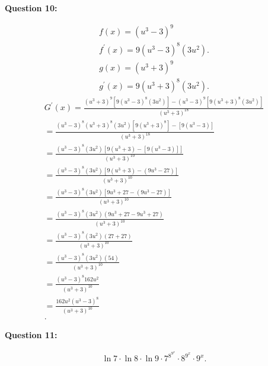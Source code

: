 \documentclass{report}
\begin{document}
    \bigbreak \noindent \bigbreak \noindent 
    \begin{Large}
        \textbf{Question 10:}
    \end{Large}
    \bigbreak \noindent 
    \bigbreak \noindent 
    \begin{align*}
      f(x) = (u^{3}-3)^{9} \\
      f^{\prime}(x) = 9(u^{3}-3)^{8}(3u^{2})
    .\end{align*}
    \begin{align*}
      g(x) = (u^{3}+3)^{9} \\
      g^{\prime}(x) = 9(u^{3}+3)^{8}(3u^{2})
    .\end{align*}
    \begin{align*}
      G^{\prime}(x) = \frac{(u^{3}+3)^{9}[9(u^{3}-3)^{8}(3u^{2})]-(u^{3}-3)^{9}[9(u^{3}+3)^{8}(3u^{2})]}{(u^{3}+3)^{18}}\\
      = \frac{(u^{3}-3)^{8}(u^{3}+3)^{8}(3u^{2})[9(u^{3}+3)^8]-[9(u^{3}-3)]}{(u^{3}+3)^{18}} \\
      = \frac{(u^{3}-3)^{8}(3u^{2})[9(u^{3}+3)-[9(u^{3}-3)]]}{(u^{3}+3)^{10}} \\
      = \frac{(u^{3}-3)^{8}(3u^{2})[9(u^{3}+3)-(9u^{3}-27)]}{(u^{3}+3)^{10}} \\
      = \frac{(u^{3}-3)^{8}(3u^{2})[9u^{3}+27-(9u^{3}-27)]}{(u^{3}+3)^{10}} \\
      = \frac{(u^{3}-3)^{8}(3u^{2})(9u^{3}+27-9u^{3}+27)}{(u^{3}+3)^{10}} \\
      = \frac{(u^{3}-3)^{8}(3u^{2})(27+27)}{(u^{3}+3)^{10}} \\
      = \frac{(u^{3}-3)^{8}(3u^{2})(54)}{(u^{3}+3)^{10}} \\
      = \frac{(u^{3}-3)^{8}162u^{2}}{(u^{3}+3)^{10}} \\
      = \frac{162u^{2}(u^{3}-3)^{8}}{(u^{3}+3)^{10}} \\
    .\end{align*}


    \bigbreak \noindent \bigbreak \noindent 
    \begin{Large}
        \textbf{Question 11:}
    \end{Large}
    \bigbreak \noindent 
    \bigbreak \noindent 
    \begin{align*}
      \ln{7}\cdot \ln{8}\cdot \ln{9} \cdot 7^{8^{9^{x}}} \cdot 8^{9^{x}} \cdot 9^{x} 
    .\end{align*}
\end{document}
